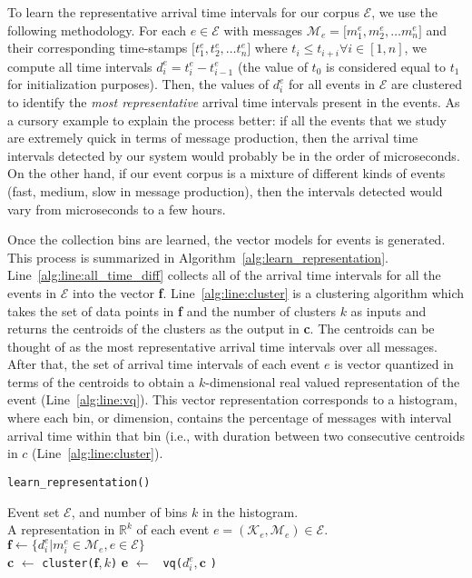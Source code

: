To learn the representative arrival time intervals for our corpus
$\mathcal{E}$, we use the following methodology. For each $e \in
\mathcal{E}$ with messages $\mathcal{M}_e = \lbrack m_{1}^e, m_{2}^e,
\ldots m_{n}^e \rbrack$ and their corresponding time-stamps $\lbrack
t_{1}^e, t_{2}^e, \ldots t_{n}^e \rbrack$ where $t_{i} \leq t_{i+i}
\forall i \in [1,n]$, we compute all time intervals $d_{i}^e =
t_{i}^e-t_{i-1}^e$ (the value of $t_{0}$ is considered equal to
$t_{1}$ for initialization purposes). Then, the values of $d_{i}^e$
for all events in $\mathcal{E}$ are clustered to identify the {\em
  most representative} arrival time intervals present in the events.
As a cursory example to explain the process better: if all the events
that we study are extremely quick in terms of message production, then
the arrival time intervals detected by our system would probably be in
the order of microseconds. On the other hand, if our event corpus is a
mixture of different kinds of events (fast, medium, slow in message
production), then the intervals detected would vary from microseconds
to a few hours.

Once the collection bins are learned, the vector models for events is
generated. This process is summarized in
Algorithm~\ref{alg:learn_representation}.
Line~\ref{alg:line:all_time_diff} collects all of the arrival time
intervals for all the events in $\mathcal{E}$ into the vector
\textbf{f}. Line~\ref{alg:line:cluster} is a clustering algorithm
which takes the set of data points in \textbf{f} and the number of
clusters $k$ as inputs and returns the centroids of the clusters as
the output in \textbf{c}. The centroids can be thought of as the most
representative arrival time intervals over all messages. After that,
the set of arrival time intervals of each event $e$ is vector
quantized in terms of the centroids to obtain a $k$-dimensional real
valued representation of the event (Line~\ref{alg:line:vq}). This
vector representation corresponds to a histogram, where each bin, or
dimension, contains the percentage of messages with interval arrival
time within that bin (i.e., with duration between two consecutive
centroids in $c$ (Line~\ref{alg:line:cluster}).

\begin{algorithm}
  \caption{{\tt learn\_representation()}}
  \label{alg:learn_representation}
  \begin{algorithmic}[1]
    \REQUIRE Event set $\mathcal{E}$, and number of bins $k$ in the histogram.\\
    \ENSURE A representation in $\mathbb{R}^{k}$ of each event $e = (\mathcal{K}_e, \mathcal{M}_e) \in \mathcal{E}$.\\
    \STATE $\textbf{f} \leftarrow \{d_{i}^e| m_{i}^e \in
    \mathcal{M}_e, e \in \mathcal{E} \}$
    \\ \label{alg:line:all_time_diff} \STATE \textbf{c} $\leftarrow$
    {\tt cluster(}$\textbf{f}, k${\tt)} \label{alg:line:cluster}
     \STATE \textbf{e} $\leftarrow$ {\tt
      vq(}$d_{i}^e, \textbf{c}$ {\tt)}\\ \label{alg:line:vq}
    \ENDFOR
  \end{algorithmic}
\end{algorithm}


